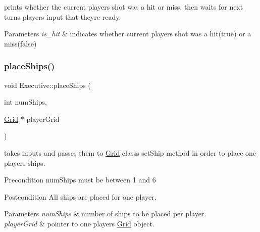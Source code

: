 prints whether the current player\textquotesingle{}s shot was a hit or miss, then waits for next turn\textquotesingle{}s player\textquotesingle{}s input that they\textquotesingle{}re ready. 


\begin{DoxyParams}{Parameters}
{\em is\+\_\+hit} & indicates whether current player\textquotesingle{}s shot was a hit(true) or a miss(false) \\
\hline
\end{DoxyParams}
\mbox{\label{classExecutive_acff54f6827b9b21462c8c5d7fad93a13}} 
\subsubsection{\texorpdfstring{place\+Ships()}{placeShips()}}
{\footnotesize\ttfamily void Executive\+::place\+Ships (\begin{DoxyParamCaption}\item[{int}]{num\+Ships,  }\item[{\hyperlink{classGrid}{Grid} $\ast$}]{player\+Grid }\end{DoxyParamCaption})}



takes inputs and passes them to \hyperlink{classGrid}{Grid} class\textquotesingle{}s set\+Ship method in order to place one player\textquotesingle{}s ships. 

\begin{DoxyPrecond}{Precondition}
num\+Ships must be between 1 and 6 
\end{DoxyPrecond}
\begin{DoxyPostcond}{Postcondition}
All ships are placed for one player. 
\end{DoxyPostcond}

\begin{DoxyParams}{Parameters}
{\em num\+Ships} & number of ships to be placed per player. \\
\hline
{\em player\+Grid} & pointer to one player\textquotesingle{}s \hyperlink{classGrid}{Grid} object. \\
\hline
\end{DoxyParams}
\mbox{\label{classExecutive_a671bfc107bd1a07b0a6b024778405282}} 
